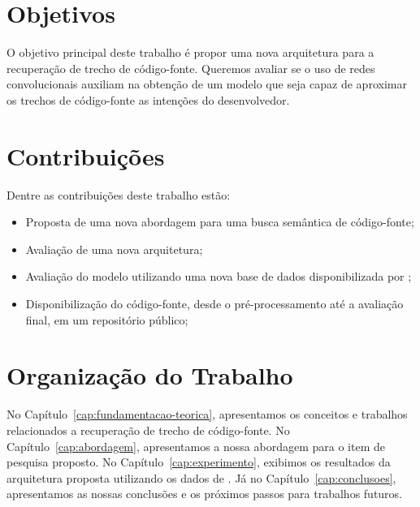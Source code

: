 \section{Objetivos}
\label{sec:objetivo}

O objetivo principal deste trabalho é propor uma nova arquitetura para a recuperação de trecho de código-fonte. Queremos avaliar se o uso de redes convolucionais auxiliam na obtenção de um modelo que seja capaz de aproximar os trechos de código-fonte as intenções do desenvolvedor. 

\section{Contribuições}
\label{sec:contribucoes}

Dentre as contribuições deste trabalho estão:

\begin{itemize}
\item Proposta de uma nova abordagem para uma busca semântica de código-fonte;
\item Avaliação de uma nova arquitetura;
\item Avaliação do modelo utilizando uma nova base de dados disponibilizada por \cite{yao-2018};
\item Disponibilização do código-fonte, desde o pré-processamento até a avaliação final, em um repositório público;
\end{itemize}

\section{Organização do Trabalho}
\label{sec:organizacao_trabalho}

No Capítulo~\ref{cap:fundamentacao-teorica}, apresentamos os conceitos e trabalhos relacionados a recuperação de trecho de código-fonte. No Capítulo~\ref{cap:abordagem}, apresentamos a nossa abordagem para o item de pesquisa proposto. No Capítulo~\ref{cap:experimento}, exibimos os resultados da arquitetura proposta utilizando os dados de \cite{yao-2018}. Já no Capítulo~\ref{cap:conclusoes}, apresentamos as nossas conclusões e os próximos passos para trabalhos futuros.